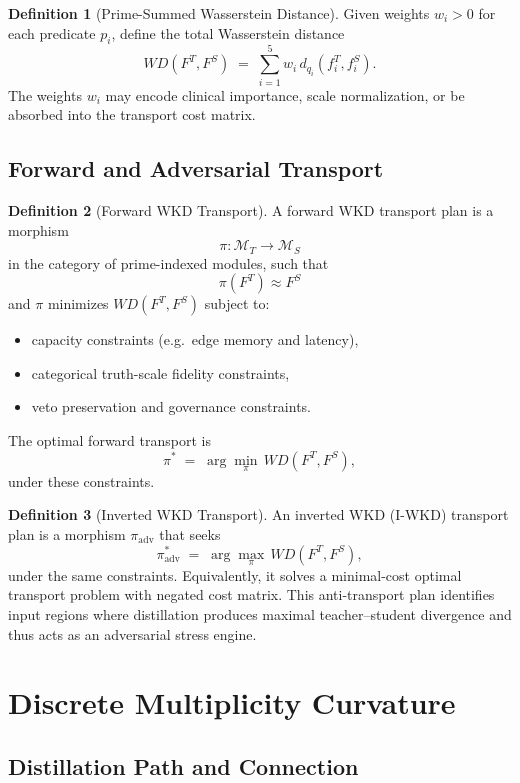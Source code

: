\documentclass[11pt]{article}
\theoremstyle{definition}
\newtheorem{defn}{Definition}[section]
\theoremstyle{plain}
\theoremstyle{remark}
\begin{document}
\begin{defn}[Prime-Summed Wasserstein Distance]
Given weights \(w_i>0\) for each predicate \(p_i\), define the total Wasserstein distance
\[
  WD(F^T, F^S)
  \;=\;
  \sum_{i=1}^5 w_i \, d_{q_i}(f_i^T, f_i^S).
\]
The weights \(w_i\) may encode clinical importance, scale normalization, or be absorbed into the transport cost matrix.
\end{defn}

\subsection{Forward and Adversarial Transport}

\begin{defn}[Forward WKD Transport]
A forward WKD transport plan is a morphism
\[
  \pi : \mathcal{M}_T \to \mathcal{M}_S
\]
in the category of prime-indexed modules, such that
\[
  \pi(F^T) \approx F^S
\]
and \(\pi\) minimizes \(WD(F^T,F^S)\) subject to:
\begin{itemize}[leftmargin=2em]
  \item capacity constraints (e.g.\ edge memory and latency),
  \item categorical truth-scale fidelity constraints,
  \item veto preservation and governance constraints.
\end{itemize}
The optimal forward transport is
\[
  \pi^* \;=\; \arg\min_{\pi} \, WD(F^T,F^S),
\]
under these constraints.
\end{defn}

\begin{defn}[Inverted WKD Transport]
An inverted WKD (I-WKD) transport plan is a morphism \(\pi_{\text{adv}}\) that seeks
\[
  \pi^*_{\text{adv}} \;=\; \arg\max_{\pi} \, WD(F^T,F^S),
\]
under the same constraints. Equivalently, it solves a minimal-cost optimal transport problem with negated cost matrix. This anti-transport plan identifies input regions where distillation produces maximal teacher–student divergence and thus acts as an adversarial stress engine.
\end{defn}

\section{Discrete Multiplicity Curvature}

\subsection{Distillation Path and Connection}
\end{document}
